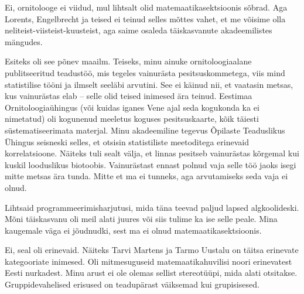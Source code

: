 
Ei, ornitolooge ei viidud, mul lihtsalt olid matemaatikasektsioonis sõbrad. Aga 
Lorents, Engelbrecht ja teised ei teinud selles mõttes vahet, et me võisime olla 
neliteist-viisteist-kuusteist, aga saime osaleda täiskasvanute 
akadeemilistes mängudes.


Esiteks oli see põnev maailm. Teiseks, minu ainuke ornitoloogiaalane 
publitseeritud teadustöö, mis tegeles vainurästa pesitsuskommetega, viis mind statistilise tööni ja ilmselt seeläbi arvutini. See ei 
käinud nii, et vaatasin metsas, kus vainurästas elab -- selle olid 
teised inimesed ära teinud. Eestimaa Ornitoloogiaühingus (või kuidas iganes Vene ajal seda kogukonda ka ei nimetatud) oli 
kogunenud meeletus koguses pesitsuskaarte, kõik täiesti 
süstematiseerimata materjal. Minu akadeemiline tegevus Õpilaste Teaduslikus 
Ühingus seisneski selles, et otsisin statistiliste meetoditega erinevaid 
korrelatsioone. Näiteks tuli sealt välja, et linnas pesitseb vainurästas 
kõrgemal kui kuskil looduslikus biotoobis. Vainurästast ennast polnud vaja selle töö jaoks isegi mitte metsas ära tunda. Mitte 
et ma ei tunneks, aga arvutamiseks seda vaja ei olnud.


Lihtsaid programmeerimisharjutusi, mida täna teevad paljud lapsed algkoolideski. Mõni täiskasvanu oli meil alati juures või siis tulime ka ise selle peale. Mina kaugemale väga ei jõudnudki, sest ma 
ei olnud matemaatikasektsioonis.


Ei, seal oli erinevaid. Näiteks Tarvi Martens ja 
Tarmo Uustalu on täitsa erinevate kategooriate inimesed. Oli mitmesuguseid matemaatikahuvilisi noori erinevatest Eesti 
nurkadest. Minu arust ei ole olemas sellist stereotüüpi, mida alati 
otsitakse. Gruppidevahelised erisused on teadupärast väiksemad kui 
grupisisesed.




